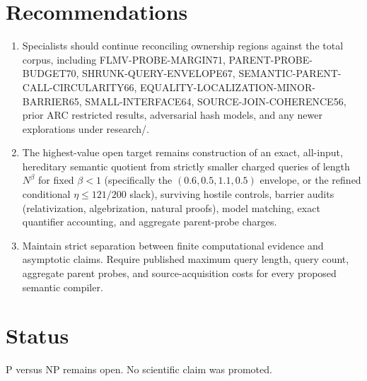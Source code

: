 \documentclass[11pt]{article}
\begin{document}
\section{Recommendations}
\begin{enumerate}
\item Specialists should continue reconciling ownership regions against the total corpus, including FLMV-PROBE-MARGIN71, PARENT-PROBE-BUDGET70, SHRUNK-QUERY-ENVELOPE67, SEMANTIC-PARENT-CALL-CIRCULARITY66, EQUALITY-LOCALIZATION-MINOR-BARRIER65, SMALL-INTERFACE64, SOURCE-JOIN-COHERENCE56, prior ARC restricted results, adversarial hash models, and any newer explorations under research/.
\item The highest-value open target remains construction of an exact, all-input, hereditary semantic quotient from strictly smaller charged queries of length $N^\beta$ for fixed $\beta<1$ (specifically the $(0.6,0.5,1.1,0.5)$ envelope, or the refined conditional $\eta\le 121/200$ slack), surviving hostile controls, barrier audits (relativization, algebrization, natural proofs), model matching, exact quantifier accounting, and aggregate parent-probe charges.
\item Maintain strict separation between finite computational evidence and asymptotic claims. Require published maximum query length, query count, aggregate parent probes, and source-acquisition costs for every proposed semantic compiler.
\end{enumerate}

\section{Status}
P versus NP remains open. No scientific claim was promoted.

\end{document}
